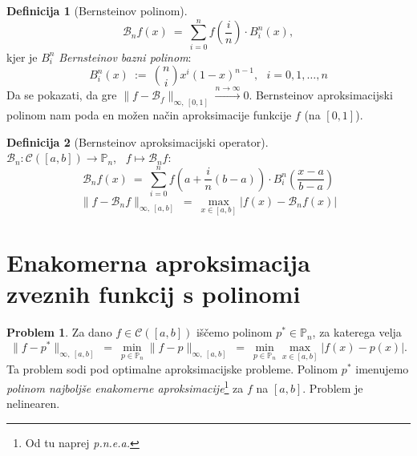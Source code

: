 \documentclass[11pt]{article}
\newcommand{\p}{\mathbb{P}}
\newcommand{\B}{\mathcal{B}}
\newcommand{\C}{\mathcal{C}}
\theoremstyle{definition}
\newtheorem{definicija}{Definicija}[section]
\theoremstyle{definition}
\newtheorem{problem}{Problem}[section]
\begin{document}
\begin{definicija}[Bernsteinov polinom]

$$\B_n f(x) ~=~ \sum_{i=0}^n f(\frac{i}{n}) \cdot B_i^n(x),$$
kjer je $B_i^n$ \textit{Bernsteinov bazni polinom}:
$$B_i^n(x) ~:=~ \binom{n}{i} x^i (1-x)^{n-1}, ~~~i = 0, 1, \ldots, n$$
Da se pokazati, da gre $\|f - \B_f\|_{\infty,~[0, 1]} \xrightarrow{n \rightarrow \infty} 0$. Bernsteinov aproksimacijski polinom nam poda en možen način aproksimacije funkcije $f$ (na $[0,1]$).

\end{definicija}
\vspace{0.5cm}

\begin{definicija}[Bernsteinov aproksimacijski operator]
~\\
$\B_n: \C([a, b]) \rightarrow \p_n$, ~$f \mapsto \B_n f$:
$$\B_n f(x) ~=~ \sum_{i=0}^n f \left( a + \frac{i}{n} (b-a) \right) \cdot B_i^n(\frac{x-a}{b-a})$$
$$\|f - \B_n f\|_{\infty, ~[a, b]} ~=~ \max_{x \in [a, b]} |f(x) - \B_n f(x)|$$ 

\end{definicija}
\vspace{0.5cm}

\pagebreak


\section{Enakomerna aproksimacija \\zveznih funkcij s polinomi}
\vspace{0.5cm}

\begin{problem}

Za dano $f \in \C([a, b])$ iščemo polinom $p^* \in \p_n$, za katerega velja
$$\|f - p^*\|_{\infty,~[a, b]} ~=~ \min_{p \in \p_n} \|f - p\|_{\infty,~[a, b]} ~=~ \min_{p \in \p_n} \max_{x \in [a, b]} |f(x) - p(x)|.$$
Ta problem sodi pod optimalne aproksimacijske probleme. Polinom $p^*$ imenujemo \textit{polinom najboljše enakomerne aproksimacije}\footnote{Od tu naprej \textit{p.n.e.a.}} za $f$ na $[a, b]$. Problem je nelinearen.

\end{problem}
\vspace{0.5cm}
\end{document}
